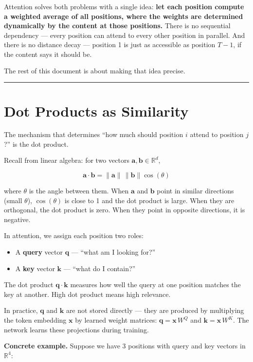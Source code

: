 Attention solves both problems with a single idea: \textbf{let each position compute a weighted average of all positions, where the weights are determined dynamically by the content at those positions.} There is no sequential dependency --- every position can attend to every other position in parallel. And there is no distance decay --- position 1 is just as accessible as position $T-1$, if the content says it should be.

The rest of this document is about making that idea precise.

\bigskip\hrule\bigskip

\section{Dot Products as Similarity}

The mechanism that determines ``how much should position $i$ attend to position $j$?'' is the dot product.

Recall from linear algebra: for two vectors $\mathbf{a}, \mathbf{b} \in \mathbb{R}^d$,

\[
\mathbf{a} \cdot \mathbf{b} = \|\mathbf{a}\| \, \|\mathbf{b}\| \cos(\theta)
\]

where $\theta$ is the angle between them. When $\mathbf{a}$ and $\mathbf{b}$ point in similar directions (small $\theta$), $\cos(\theta)$ is close to 1 and the dot product is large. When they are orthogonal, the dot product is zero. When they point in opposite directions, it is negative.

In attention, we assign each position two roles:

\begin{itemize}
  \item A \textbf{query} vector $\mathbf{q}$ --- ``what am I looking for?''
  \item A \textbf{key} vector $\mathbf{k}$ --- ``what do I contain?''
\end{itemize}

The dot product $\mathbf{q} \cdot \mathbf{k}$ measures how well the query at one position matches the key at another. High dot product means high relevance.

In practice, $\mathbf{q}$ and $\mathbf{k}$ are not stored directly --- they are produced by multiplying the token embedding $\mathbf{x}$ by learned weight matrices: $\mathbf{q} = \mathbf{x}\, W^Q$ and $\mathbf{k} = \mathbf{x}\, W^K$. The network learns these projections during training.

\textbf{Concrete example.} Suppose we have 3 positions with query and key vectors in $\mathbb{R}^4$:

